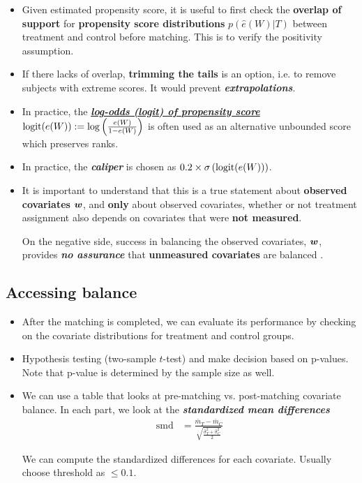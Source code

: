 \documentclass[11pt]{article}
\begin{document}
\begin{itemize}
\item Given estimated propensity score, it is useful to first check the \textbf{overlap of support} for \textbf{propensity score distributions} $p(\hat{e}(W)| T)$ between treatment and control before matching. This is to verify the positivity assumption. 

\item If there lacks of overlap, \textbf{trimming the tails} is an option, i.e. to remove subjects with extreme scores. It would prevent \emph{\textbf{extrapolations}}. 

\item In practice, the \underline{\textbf{\emph{log-odds (logit) of propensity score}}} $\text{logit}(e(W)) := \log\left(\frac{e(W)}{1- e(W)}\right)$ is often used as an alternative unbounded score which preserves ranks.

\item In practice, the \emph{\textbf{caliper}} is chosen as $0.2 \times \sigma\left(\text{logit}(e(W))\right)$.


\item It is important to understand that this is a true statement about \textbf{observed covariates} $\boldsymbol{w}$, and \textbf{only} about observed covariates, whether or not treatment assignment also depends on covariates that were \textbf{not measured}.

On the negative side, success in balancing the observed covariates, $\boldsymbol{w}$, provides \emph{\textbf{no assurance}} that \textbf{unmeasured covariates} are balanced  \citep{rosenbaum2017observation}.
\end{itemize}
\subsection{Accessing balance}
\begin{itemize}
\item After the matching is completed, we can evaluate its performance by checking on the covariate distributions for treatment and control groups.

\item Hypothesis testing (two-sample $t$-test) and make decision based on p-values. Note that p-value is determined by the sample size as well.

\item We can use a table that looks at pre-matching vs. post-matching covariate balance. In each part, we look at the \emph{\textbf{standardized mean differences}}
\begin{align*}
\text{smd} &= \frac{\bar{m}_{T} - \bar{m}_{C}}{\sqrt{\frac{\hat{\sigma}_{T}^{2} + \hat{\sigma}_{C}^{2}}{2}}}
\end{align*}

We can compute the standardized differences for each covariate. Usually choose threshold as $\le 0.1$.

\end{itemize}
\end{document}
